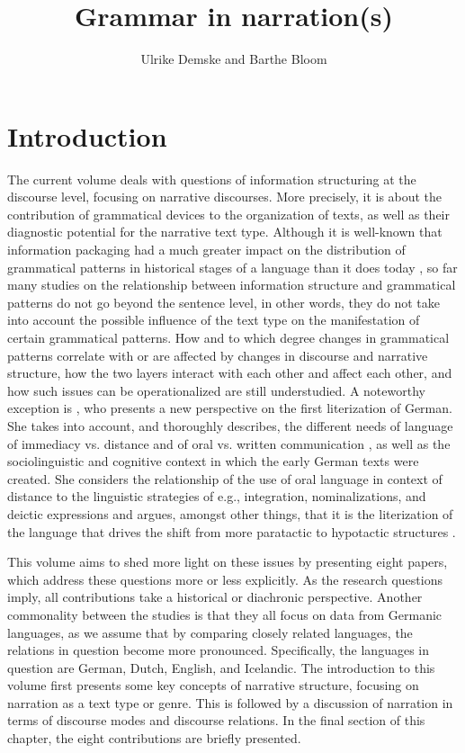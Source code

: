 \documentclass[output=paper,colorlinks,citecolor=brown]{langscibook}
\author{Ulrike Demske\affiliation{Universität Potsdam} and Barthe Bloom\orcid{0000-0003-3378-9856}\affiliation{Friedrich-Alexander-Universität Erlangen-Nürnberg}}
\title{Grammar in narration(s)}
\begin{document}
\maketitle

\section{Introduction}
The current volume deals with questions of information structuring at the discourse level, focusing on narrative discourses. More precisely, it is about the contribution of grammatical devices to the organization of texts, as well as their diagnostic potential for the narrative text type. Although it is well-known that information packaging had a much greater impact on the distribution of grammatical patterns in historical stages of a language than it does today \citep{herring2001,traugott2007,KeMi2012,BeSa2014}, so far many studies on the relationship between information structure and grammatical patterns do not go beyond the sentence level, in other words, they do not take into account the possible influence of the text type on the manifestation of certain grammatical patterns. How and to which degree changes in grammatical patterns correlate with or are affected by changes in discourse and narrative structure, how the two layers interact with each other and affect each other, and how such issues can be operationalized are still understudied. A noteworthy exception is \citet{Somers2024}, who presents a new perspective on the first literization of German. She takes into account, and thoroughly describes, the different needs of language of immediacy vs. distance and of oral vs. written communication \citep{koch1985sprache}, as well as the sociolinguistic and cognitive context in which the early German texts were created. She considers the relationship of the use of oral language in context of distance to the linguistic strategies of e.g., integration, nominalizations, and deictic expressions and argues, amongst other things, that it is the literization of the language that drives the shift from more paratactic to hypotactic structures \citep[196]{Somers2024}.

This volume aims to shed more light on these issues by presenting eight papers, which address these questions more or less explicitly. As the research questions imply, all contributions take a historical or diachronic perspective. Another commonality between the studies is that they all focus on data from Germanic languages, as we assume that by comparing closely related languages, the relations in question become more pronounced. Specifically, the languages in question are German, Dutch, English, and Icelandic. The introduction to this volume first presents some key concepts of narrative structure, focusing on narration as a text type or genre. This is followed by a discussion of narration in terms of discourse modes and discourse relations. In the final section of this chapter, the eight contributions are briefly presented. 
\end{document}

